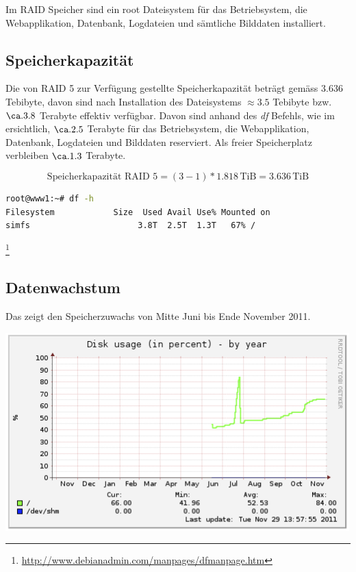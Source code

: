 Im RAID Speicher sind ein root Dateisystem für das Betriebsystem, die Webapplikation, Datenbank, Logdateien und sämtliche Bilddaten installiert.

\subsection{Speicherkapazität}
Die von RAID 5 zur Verfügung gestellte Speicherkapazität beträgt gemäss  3.636 Tebibyte, davon sind nach Installation des Dateisystems $\approx 3.5$ Tebibyte bzw. $\ca. 3.8 $ Terabyte effektiv verfügbar. Davon sind anhand des \textit{df} Befehls,  wie im ersichtlich, $\ca. 2.5$ Terabyte für das Betriebsystem, die Webapplikation, Datenbank, Logdateien und Bilddaten reserviert. Als freier Speicherplatz verbleiben $\ca. 1.3$ Terabyte.

\begin{equation}
\mbox{Speicherkapazität RAID 5}= (3 - 1) * 1.818  \, \mathrm{TiB} =  3.636 \, \mathrm{TiB}
\label{eqn:RAID 5-3disk}
\end{equation}

\begin{lstlisting}[label=df, language=Bash, caption=Report Dateisystem Speicherplatz Belegung in Dezimal Prefix ]
root@www1:~# df -h
Filesystem            Size  Used Avail Use% Mounted on
simfs                      3.8T  2.5T  1.3T   67% /
\end{lstlisting}
\footnote{\url{http://www.debianadmin.com/manpages/dfmanpage.htm}}

\subsection{Datenwachstum}
Das  zeigt den Speicherzuwachs von Mitte Juni bis Ende November 2011.

\begin{center}
\includegraphics[width=\linewidth, keepaspectratio = true]{media/disk-usage-by-year.png}
\end{center}

